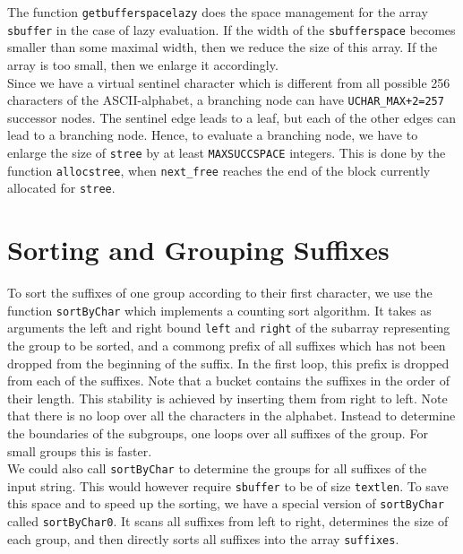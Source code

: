 \documentclass[a4paper]{article}
\begin{document}
The function \texttt{getbufferspacelazy} does the space management for the
array \texttt{sbuffer} in the case of lazy evaluation. If the width of the
\texttt{sbufferspace} becomes smaller than some maximal width, then we reduce
the size of this array. If the array is too small, then we enlarge it
accordingly.\\


Since we have a virtual sentinel character which is different from all possible
256 characters of the ASCII-alphabet, a branching node can have
\texttt{UCHAR\_MAX+2=257} successor nodes. The sentinel edge leads to a leaf,
but each of the other edges can lead to a branching node. Hence, to evaluate a
branching node, we have to enlarge the size of \texttt{stree} by at least
\texttt{MAXSUCCSPACE} integers. This is done by the function
\texttt{allocstree}, when \texttt{next_free} reaches the end of the
block currently allocated for \texttt{stree}.


\section{Sorting and Grouping Suffixes}

To sort the suffixes of one group according to their first character,
we use the function \texttt{sortByChar} which implements a counting sort
algorithm. It takes as arguments the left and right bound \texttt{left} and
\texttt{right} of the subarray representing the group to be sorted, and
a commong prefix of all suffixes which has not been dropped from the
beginning of the suffix. In the first loop, this prefix is dropped
from each of the suffixes. Note that a bucket contains the suffixes
in the order of their length. This stability is achieved by inserting
them from right to left. Note that there is no loop over all the
characters in the alphabet. Instead to determine the boundaries
of the subgroups, one loops over all suffixes of the group. For small
groups this is faster.\\


We could also call \texttt{sortByChar} to determine the groups for all suffixes
of the input string. This would however require \texttt{sbuffer} to be of size
\texttt{textlen}. To save this space and to speed up the sorting, we have a
special version of \texttt{sortByChar} called \texttt{sortByChar0}. It scans
all suffixes from left to right, determines the size of each group, and then
directly sorts all suffixes into the array \texttt{suffixes}.\\
\end{document}
